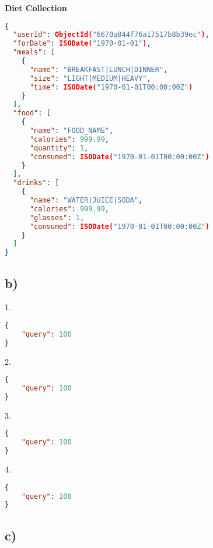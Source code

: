\documentclass{article}
\begin{document}
\textbf{Diet Collection}
\begin{lstlisting}[language=json]
{
  "userId": ObjectId("6670a844f76a17517b8b39ec"),
  "forDate": ISODate("1970-01-01"),
  "meals": [
    {
      "name": "BREAKFAST|LUNCH|DINNER",
      "size": "LIGHT|MEDIUM|HEAVY",
      "time": ISODate("1970-01-01T00:00:00Z")
    }
  ],
  "food": [
    {
      "name": "FOOD_NAME",
      "calories": 999.99,
      "quantity": 1,
      "consumed": ISODate("1970-01-01T00:00:00Z")
    }
  ],
  "drinks": [
    {
      "name": "WATER|JUICE|SODA",
      "calories": 999.99,
      "glasses": 1,
      "consumed": ISODate("1970-01-01T00:00:00Z")
    }
  ]
}
\end{lstlisting} 
\pagebreak
\subsection*{\small b)}

\hspace{0cm}1.
\begin{lstlisting}[language=json]
{
    "query": 100
} 
\end{lstlisting} 
\hspace{0cm}2.
\begin{lstlisting}[language=json]
{                   
    "query": 100
}
\end{lstlisting}
\hspace{0cm}3. 
\begin{lstlisting}[language=json]
{
    "query": 100
}
\end{lstlisting}
\hspace{0cm}4. 
\begin{lstlisting}[language=json]
{
    "query": 100
}
\end{lstlisting}

\pagebreak

\subsection*{\small c)}
\end{document}
